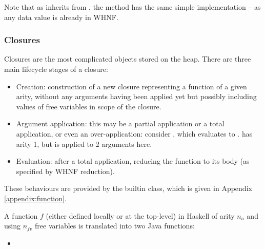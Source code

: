 \documentclass[dissertation.tex]{subfiles}
\begin{document}
{{{            Note that as  inherits from , the  method has the same simple
            implementation -- as any data value is already in WHNF.

        }
        \subsubsection{Closures}\label{sec:closures}
        {

            Closures are the most complicated objects stored on the heap. There are three main lifecycle stages of a
            closure:

            \begin{itemize}
            \item
            {
                Creation: construction of a new closure representing a function of a given arity, without any
                arguments having been applied yet but possibly including values of free variables in scope of the
                closure.
            }
            \item
            {
                
                Argument application: this may be a partial application or a total application, or even an
                over-application: consider , which evaluates to .  has
                arity 1, but is applied to 2 arguments here.

            }
            \item
            {
                Evaluation: after a total application, reducing the function to its body (as specified by WHNF
                reduction).
            }
            \end{itemize}

            These behaviours are provided by the  builtin class, which is given in Appendix
            \ref{appendix:function}.


            A function \(f\) (either defined locally or at the top-level) in Haskell of arity \(n_a\) and using
            \(n_{fv}\) free variables is translated into two Java functions:
            
            \begin{itemize}
            \item
            {
                
}
\end{itemize}}}}
\end{document}
